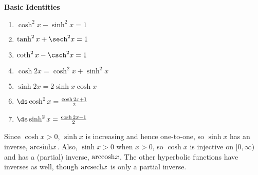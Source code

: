\textbf{Basic Identities}\par
\begin{enumerate}
\item $\cosh^2x-\sinh^2x=1$%
%
\item	$\tanh^2x+\sech^2x=1$
\item	$\coth^2x-\csch^2x = 1$
\item	$\cosh 2x=\cosh^2x+\sinh^2x$
\item	$\sinh 2x = 2\sinh x\cosh x$
\item	$\ds\cosh^2x = \frac{\cosh 2x+1}{2}$
\item $\ds \sinh^2x=\frac{\cosh 2x-1}{2}$
\end{enumerate}





Since $\cosh x > 0$, $\sinh x$ is increasing and hence one-to-one, so
$\sinh x$ has an inverse, ${\rm arcsinh} x$. Also, $\sinh x > 0$ when
$x>0$, so $\cosh x$ is injective on $[0,\infty)$ and has a (partial)
inverse, ${\rm arccosh} x$. The other hyperbolic functions have inverses
as well, though ${\rm arcsech} x$ is only a partial inverse. 


